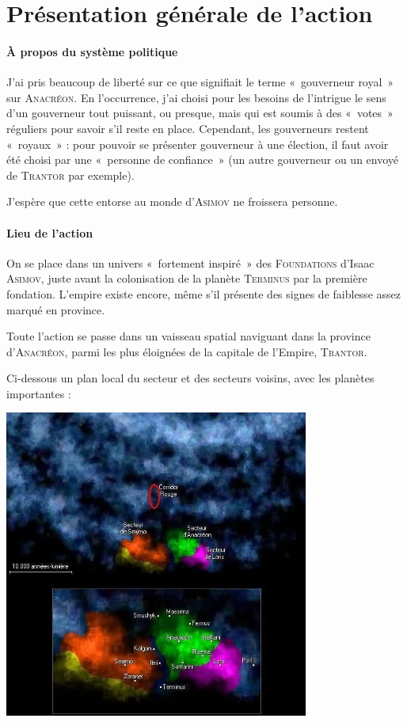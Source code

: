\documentclass{article}
\begin{document}
\section{Présentation générale de l’action}

\paragraph{À propos du système politique}
{
J’ai pris beaucoup de liberté sur ce que signifiait le terme «~gouverneur royal~» sur \textsc{Anacréon}.
En l’occurrence, j’ai choisi pour les besoins de l’intrigue le sens d’un gouverneur tout puissant, ou presque, mais qui est soumis à des «~votes~» réguliers pour savoir s’il reste en place.
Cependant, les gouverneurs restent «~royaux~» : pour pouvoir se présenter gouverneur à une élection, il faut avoir été choisi par une «~personne de confiance~» (un autre gouverneur ou un envoyé de \textsc{Trantor} par exemple).

J’espère que cette entorse au monde d’\textsc{Asimov} ne froissera personne.
}

\paragraph{Lieu de l’action}
{
On se place dans un univers «~fortement inspiré~» des \textsc{Foundations} d’Isaac \textsc{Asimov}, juste avant la colonisation de la planète \textsc{Terminus} par la première fondation. L’empire existe encore, même s’il présente des signes de faiblesse assez marqué en province.

Toute l’action se passe dans un vaisseau spatial naviguant dans la province d’\textsc{Anacréon}, parmi les plus éloignées de la capitale de l’Empire, \textsc{Trantor}.

Ci-dessous un plan local du secteur et des secteurs voisins, avec les planètes importantes :
\begin{center}
	\includegraphics[width=10cm]{galactographie.png}
\end{center}
}
\end{document}
